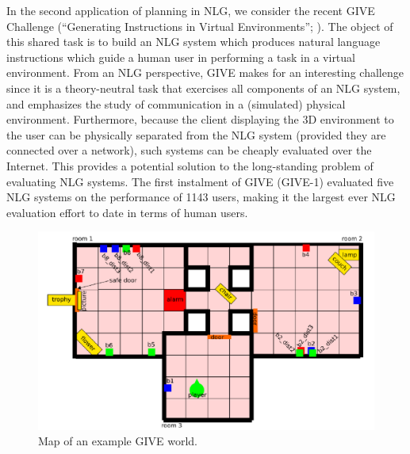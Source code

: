In the second application of planning in NLG, we consider the recent GIVE
Challenge (``Generating Instructions in Virtual Environments'';
\citealt{ByrKolStrCasDalMooObe09}). The object of this shared task is to
build an NLG system which produces natural language instructions which
guide a human user in performing a task in a virtual environment. From an
NLG perspective, GIVE makes for an interesting challenge since it is a
theory-neutral task that exercises all components of an NLG system, and
emphasizes the study of communication in a (simulated) physical
environment. Furthermore, because the client displaying the 3D environment
to the user can be physically separated from the NLG system (provided they
are connected over a network), such systems can be cheaply evaluated over
the Internet. This provides a potential solution to the long-standing
problem of evaluating NLG systems. The first instalment of GIVE (GIVE-1)
evaluated five NLG systems on the performance of 1143 users, making it the
largest ever NLG evaluation effort to date in terms of human users.

\begin{figure}[t]
\centering
\includegraphics[width=0.75\columnwidth]{give_world_2}
\caption{Map of an example GIVE world.}
  \label{fig:give-development-world}
\end{figure}

